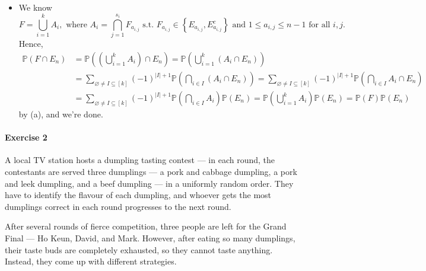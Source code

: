 \documentclass[a4paper,12pt]{article}
\begin{document}
\begin{itemize}
\begin{itemize}
\begin{align*}
		\end{align*}
		and by induction hypothesis,
		\[
			\mathbb{P} \left( \bigcap_{i=1}^{n} F_i  \right) = \mathbb{P} \left( \bigcap_{i=1}^{k} E_i  \right)  \mathbb{P} \left( \bigcap_{i=k+1}^{n} E_i^c  \right) = \prod _{i=1}^k \mathbb{P} (E_i) \prod _{i = k + 1}^n \mathbb{P} \left( E_i^c \right) = \prod _{i=1}^n \mathbb{P} (F_i), 
		\]
		so we're done.
	\end{itemize}
	\item [(b)] We know
	\[
		F = \bigcup_{i=1}^{k} A_i, \text{ where } A_i = \bigcap_{j=1}^{s_i} F_{a_{i, j}} \text{ s.t. } F_{a_{i, j}} \in \left\{ E_{a_{i, j}}, E_{a_{i, j}}^c \right\} \text{ and } 1 \le a_{i, j} \le n-1 \text{ for all } i, j.      
	\]
	Hence,
	\begin{align*}
		\mathbb{P} (F \cap E_n) &= \mathbb{P} \left( \left( \bigcup_{i=1}^{k} A_i  \right) \cap E_n  \right) = \mathbb{P} \left( \bigcup_{i=1}^{k} (A_i \cap E_n)  \right) \\
		&= \sum_{\varnothing \neq I \subseteq [k]} (-1)^{\vert I \vert + 1} \mathbb{P} \left( \bigcap_{i \in I} (A_i \cap E_n)  \right) = \sum_{\varnothing \neq I \subseteq [k]} (-1)^{\vert I \vert + 1} \mathbb{P} \left( \bigcap_{i \in I} A_i \cap E_n  \right) \\
		&= \sum_{\varnothing \neq I \subseteq [k]} (-1)^{\vert I \vert + 1} \mathbb{P} \left( \bigcap_{i \in I} A_i  \right) \mathbb{P} (E_n) = \mathbb{P} \left( \bigcup_{i=1}^k A_i  \right)  \mathbb{P} (E_n) = \mathbb{P} (F) \mathbb{P} (E_n)   
	\end{align*}
	by (a), and we're done.
\end{itemize}

\paragraph{Exercise 2}  A local TV station hosts a dumpling tasting contest --- in each round, the contestants are served three dumplings --- a pork and cabbage dumpling, a pork and leek dumpling, and a beef dumpling --- in a uniformly random order. They have to identify the flavour of each dumpling, and whoever gets the most dumplings correct in each round progresses to the next round.

After several rounds of fierce competition, three people are left for the Grand Final --- Ho Keun, David, and Mark. However, after eating so many dumplings, their taste buds are completely exhausted, so they cannot taste anything. Instead, they come up with different strategies.
\end{document}
